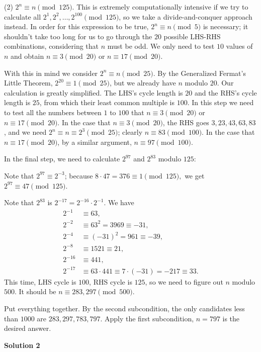 \begin{enumerate}
 (2) $2^n \equiv n \pmod{125}$. This is extremely computationally intensive if we try to calculate all $2^1,2^2,\ldots,2^{100} \pmod{125}$, so we take a divide-and-conquer approach instead. In order for this expression to be true, $2^n \equiv n \pmod{5}$ is necessary; it shouldn't take too long for us to go through the $20$ possible LHS-RHS combinations, considering that $n$ must be odd. We only need to test $10$ values of $n$ and obtain $n \equiv 3 \pmod{20}$ or $n \equiv 17 \pmod{20}$.

 With this in mind we consider $2^n \equiv n \pmod{25}$. By the Generalized Fermat's Little Theorem, $2^{20} \equiv 1 \pmod{25}$, but we already have $n$ modulo $20$. Our calculation is greatly simplified. The LHS's cycle length is $20$ and the RHS's cycle length is $25$, from which their least common multiple is $100$. In this step we need to test all the numbers between $1$ to $100$ that $n \equiv 3 \pmod{20}$ or $n \equiv 17 \pmod{20}$. In the case that $n \equiv 3 \pmod{20}$, the RHS goes $3,23,43,63,83$, and we need $2^n \equiv n \equiv 2^3 \pmod{25}$; clearly $n \equiv 83 \pmod{100}$. In the case that $n \equiv 17 \pmod{20}$, by a similar argument, $n \equiv 97 \pmod{100}$. 

 In the final step, we need to calculate $2^{97}$ and $2^{83}$ modulo $125$:

 Note that $2^{97}\equiv2^{-3}$; because $8\cdot47=376\equiv1\pmod{125},$ we get $2^{97} \equiv 47\pmod{125}$. 

 Note that $2^{83}$ is $2^{-17}=2^{-16}\cdot2^{-1}$. We have
 \begin{align*} 2^{-1}&\equiv63, \\ 2^{-2}&\equiv63^2=3969\equiv-31, \\ 2^{-4}&\equiv(-31)^2=961\equiv-39, \\ 2^{-8}&\equiv1521\equiv21, \\ 2^{-16}&\equiv441, \\ 2^{-17}&\equiv63\cdot441\equiv7\cdot(-31)=-217\equiv33. \end{align*}
 This time, LHS cycle is $100$, RHS cycle is $125$, so we need to figure out $n$ modulo $500$. It should be $n \equiv 283,297 \pmod{500}$.

 Put everything together. By the second subcondition, the only candidates less than $1000$ are $283,297,783,797$. Apply the first subcondition, $n=\boxed{797}$ is the desired answer.

 



\textbf{Solution 2}


\end{enumerate}
